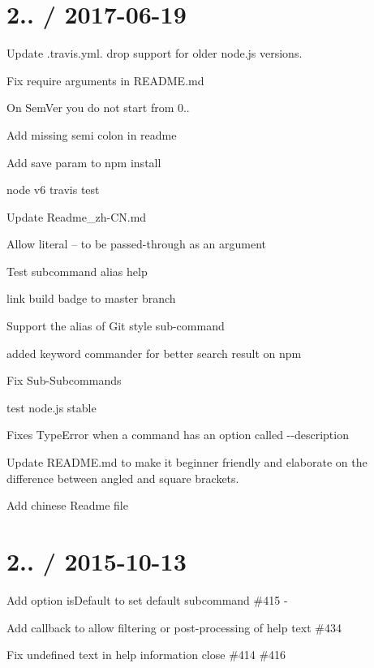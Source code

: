 \section*{2.. / 2017-\/06-\/19 }


\begin{DoxyItemize}
\item Update .travis.\+yml. drop support for older node.\+js versions.
\item Fix require arguments in R\+E\+A\+D\+M\+E.\+md
\item On Sem\+Ver you do not start from 0..
\item Add missing semi colon in readme
\item Add save param to npm install
\item node v6 travis test
\item Update Readme\+\_\+zh-\/\+C\+N.\+md
\item Allow literal \textquotesingle{}--\textquotesingle{} to be passed-\/through as an argument
\item Test subcommand alias help
\item link build badge to master branch
\item Support the alias of Git style sub-\/command
\item added keyword commander for better search result on npm
\item Fix Sub-\/\+Subcommands
\item test node.\+js stable
\item Fixes Type\+Error when a command has an option called {\ttfamily -\/-\/description}
\item Update R\+E\+A\+D\+M\+E.\+md to make it beginner friendly and elaborate on the difference between angled and square brackets.
\item Add chinese Readme file
\end{DoxyItemize}

\section*{2.. / 2015-\/10-\/13 }


\begin{DoxyItemize}
\item Add option {\ttfamily is\+Default} to set default subcommand \#415 -\/
\item Add callback to allow filtering or post-\/processing of help text \#434 
\item Fix {\ttfamily undefined} text in help information close \#414 \#416 
\end{DoxyItemize}

